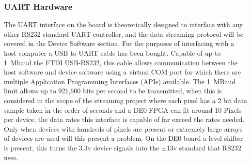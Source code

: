 \subsubsection{UART Hardware}
The UART interface on the board is theoretically designed to interface with any other RS232 standard UART controller, and the data streaming protocol will be covered in the Device Software section. For the purposes of interfacing with a host computer a USB to UART cable has been bought. Capable of up to 1~Mbaud the FTDI USB-RS232, this cable allows communication between the host software and device software using a virtual COM port for which there are multiple Application Programming Interfaces (APIs) available. The 1~MBaud limit allows up to 921,600 bits per second to be transmitted, when this is considered in the scope of the streaming project where each pixel has  a 2 bit data sample taken in the order of seconds and a DE0 FPGA can fit around 10 Pixels per device, the data rates this interface is capable of far exceed the rates needed. Only when devices with hundreds of pixels are present or extremely large arrays of devices are used will this present a problem. On the DE0 board a level shifter is present, this turns the 3.3v device signals into the $\pm$13v standard that RS232 uses.

